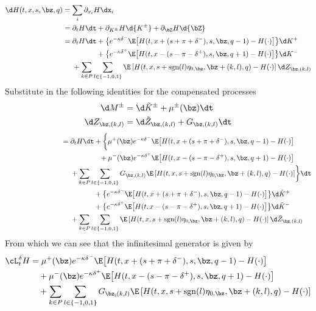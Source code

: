 \documentclass[12pt]{article}
\begin{document}
\begin{align*}
\d H (t,x,s,\bz,q) & = \sum\limits_i \partial_{x_i} H \dx_i \\
& = \partial_t H \dt + \partial_{K^{\pm}} H \d {K^{\pm}} + \partial_{\bZ} H \d {\bZ} \\
& = \partial_t H \dt + \bigl\lbrace e^{ -\kappa \delta^{-}} \E \bigl[ H(t,x+(s+\pi+\delta^-),s,\bz,q-1) - H(\cdot) \bigr] \bigr\rbrace \d K^+\\
& \hphantom{{}={} \partial_t H \dt} + \bigl\lbrace e^{ -\kappa \delta^{+}} \E \bigl[ H(t,x-(s-\pi-\delta^+),s,\bz,q+1) - H(\cdot) \bigr] \bigr\rbrace \d K^-\\
& \hphantom{{}={}} + \sum_{k\in P} \sum_{l \in \{-1,0,1\}} \E \left[ H(t,x,s+\mathrm{sgn}(l)\eta_{0,\bz},\bz+(k,l),q) - H(\cdot) \right] \d Z_{\bz,(k,l)}
\end{align*}
Substitute in the following identities for the compensated processes
\begin{align*} 
\d M^{\pm} & = \d \tilde{K}^{\pm} + \mu^{\pm}(\bz) \dt \\
\d Z_{\bz,(k,l)}  & = \d \tilde{Z}_{\bz,(k,l)}  + G_{\bz,(k,l)} \dt 
\end{align*}
\begin{align*}
{}\phantom{\d H (t,x,s,\bz,q)} & = \partial_t H \dt + \biggl\lbrace \mu^+(\bz) e^{ -\kappa \delta^{-}} \E \bigl[ H(t,x+(s+\pi+\delta^-),s,\bz,q-1) - H(\cdot) \bigr] \\
& \hphantom{{}={} \partial_t H \dt +} + \mu^-(\bz) e^{ -\kappa \delta^{+}} \E \bigl[ H(t,x-(s-\pi-\delta^+),s,\bz,q+1) - H(\cdot) \bigr] \\
& \hphantom{{}={}} + \sum_{k\in P} \sum_{l \in \{-1,0,1\}} G_{\bz,(k,l)} \E \left[ H(t,x,s+\mathrm{sgn}(l)\eta_{0,\bz},\bz+(k,l),q) - H(\cdot) \right]  \biggr\rbrace \dt \\
& \hphantom{{}={} \partial_t H \dt} + \bigl\lbrace e^{ -\kappa \delta^{-}} \E \bigl[ H(t,x+(s+\pi+\delta^-),s,\bz,q-1) - H(\cdot) \bigr] \bigr\rbrace \d \tilde{K}^+\\
& \hphantom{{}={} \partial_t H \dt} + \bigl\lbrace e^{ -\kappa \delta^{+}} \E \bigl[ H(t,x-(s-\pi-\delta^+),s,\bz,q+1) - H(\cdot) \bigr] \bigr\rbrace \d \tilde{K}^-\\
& \hphantom{{}={}} + \sum_{k\in P} \sum_{l \in \{-1,0,1\}} \E \left[ H(t,x,s+\mathrm{sgn}(l)\eta_{0,\bz},\bz+(k,l),q) - H(\cdot) \right] \d \tilde{Z}_{\bz,(k,l)}\
\end{align*}
From which we can see that the infinitesimal generator is given by
\begin{equation}
\label{eq:infgen}
\begin{split}
\cL^{\delta}_t H & = \mu^+(\bz) e^{ -\kappa \delta^{-}} \E \bigl[ H(t,x+(s+\pi+\delta^-),s,\bz,q-1) - H(\cdot) \bigr] \\
& \quad + \mu^-(\bz) e^{ -\kappa \delta^{+}} \E \bigl[ H(t,x-(s-\pi-\delta^+),s,\bz,q+1) - H(\cdot) \bigr] \\
& \quad + \sum_{k\in P} \sum_{l \in \{-1,0,1\}} G_{\bz,(k,l)} \E \left[ H(t,x,s+\mathrm{sgn}(l)\eta_{0,\bz},\bz+(k,l),q) - H(\cdot) \right] 
\end{split}
\end{equation}
\end{document}
